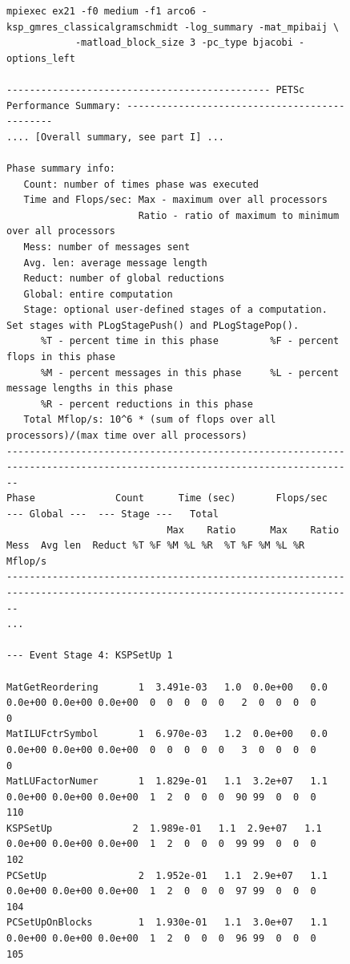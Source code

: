 \begin{figure}[tb]
{\tiny
\begin{verbatim}
mpiexec ex21 -f0 medium -f1 arco6 -ksp_gmres_classicalgramschmidt -log_summary -mat_mpibaij \
            -matload_block_size 3 -pc_type bjacobi -options_left

---------------------------------------------- PETSc Performance Summary: ----------------------------------------------
.... [Overall summary, see part I] ...

Phase summary info:
   Count: number of times phase was executed
   Time and Flops/sec: Max - maximum over all processors
                       Ratio - ratio of maximum to minimum over all processors
   Mess: number of messages sent
   Avg. len: average message length
   Reduct: number of global reductions
   Global: entire computation
   Stage: optional user-defined stages of a computation. Set stages with PLogStagePush() and PLogStagePop().
      %T - percent time in this phase         %F - percent flops in this phase
      %M - percent messages in this phase     %L - percent message lengths in this phase
      %R - percent reductions in this phase
   Total Mflop/s: 10^6 * (sum of flops over all processors)/(max time over all processors)
------------------------------------------------------------------------------------------------------------------------
Phase              Count      Time (sec)       Flops/sec                          --- Global ---  --- Stage ---   Total
                            Max    Ratio      Max    Ratio  Mess  Avg len  Reduct %T %F %M %L %R  %T %F %M %L %R Mflop/s
------------------------------------------------------------------------------------------------------------------------
...
 
--- Event Stage 4: KSPSetUp 1

MatGetReordering       1  3.491e-03   1.0  0.0e+00   0.0  0.0e+00 0.0e+00 0.0e+00  0  0  0  0  0   2  0  0  0  0     0
MatILUFctrSymbol       1  6.970e-03   1.2  0.0e+00   0.0  0.0e+00 0.0e+00 0.0e+00  0  0  0  0  0   3  0  0  0  0     0
MatLUFactorNumer       1  1.829e-01   1.1  3.2e+07   1.1  0.0e+00 0.0e+00 0.0e+00  1  2  0  0  0  90 99  0  0  0   110
KSPSetUp              2  1.989e-01   1.1  2.9e+07   1.1  0.0e+00 0.0e+00 0.0e+00  1  2  0  0  0  99 99  0  0  0   102
PCSetUp                2  1.952e-01   1.1  2.9e+07   1.1  0.0e+00 0.0e+00 0.0e+00  1  2  0  0  0  97 99  0  0  0   104
PCSetUpOnBlocks        1  1.930e-01   1.1  3.0e+07   1.1  0.0e+00 0.0e+00 0.0e+00  1  2  0  0  0  96 99  0  0  0   105


\end{verbatim}}
\end{figure}
